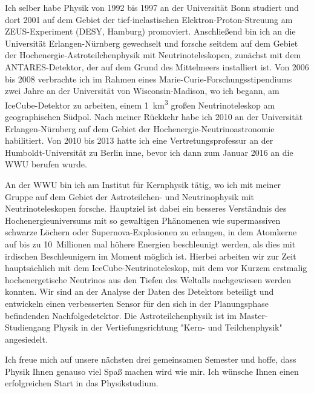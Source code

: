\begin{multicols}{2}
Ich selber habe Physik von 1992 bis 1997 an der Universität Bonn studiert und dort 2001 auf dem Gebiet der tief-inelastischen Elektron-Proton-Streuung am ZEUS-Experiment (DESY, Hamburg) promoviert.
Anschließend bin ich an die Universität Erlangen-Nürnberg gewechselt und forsche seitdem auf dem Gebiet der Hochenergie-Astroteilchenphysik mit Neutrinoteleskopen, zunächst mit dem ANTARES-Detektor, der auf dem Grund des Mittelmeers installiert ist.
Von 2006 bis 2008 verbrachte ich im Rahmen eines Marie-Curie-Forschungsstipendiums zwei Jahre an der Universität von Wisconsin-Madison, wo ich begann, am IceCube-Detektor zu arbeiten, einem \SI{1}{\km\cubed} großen Neutrinoteleskop am geographischen Südpol.
Nach meiner Rückkehr habe ich 2010 an der Universität Erlangen-Nürnberg auf dem Gebiet der Hochenergie-Neutrinoastronomie habilitiert.
Von 2010 bis 2013 hatte ich eine Vertretungsprofessur an der Humboldt-Universität zu Berlin inne, bevor ich dann zum Januar 2016 an die WWU berufen wurde.

An der WWU bin ich am Institut für Kernphysik tätig, wo ich mit meiner Gruppe auf dem Gebiet der Astroteilchen- und Neutrinophysik mit Neutrinoteleskopen forsche.
Hauptziel ist dabei ein besseres Verständnis des Hochenergieuniversums mit so gewaltigen Phänomenen wie supermassiven schwarze Löchern oder Supernova-Explosionen zu erlangen, in dem Atomkerne auf bis zu 10~Millionen mal höhere Energien beschleunigt werden, als dies mit irdischen Beschleunigern im Moment möglich ist.
Hierbei arbeiten wir zur Zeit hauptsächlich mit dem IceCube-Neutrinoteleskop, mit dem vor Kurzem erstmalig hochenergetische Neutrinos aus den Tiefen des Weltalls nachgewiesen werden konnten.
Wir sind an der Analyse der Daten des Detektors beteiligt und entwickeln einen verbesserten Sensor für den sich in der Planungsphase befindenden Nachfolgedetektor.
Die Astroteilchenphysik ist im Master-Studiengang Physik in der Vertiefungsrichtung "Kern- und Teilchenphysik" angesiedelt.

Ich freue mich auf unsere nächsten drei gemeinsamen Semester und hoffe, dass Physik Ihnen genauso viel Spaß machen wird wie mir.
Ich wünsche Ihnen einen erfolgreichen Start in das Physikstudium.
\end{multicols}

\begin{center}
\end{center}

